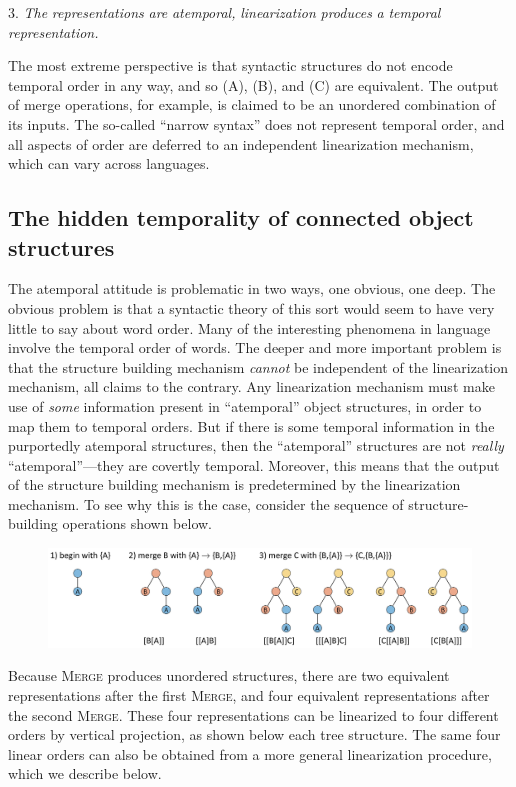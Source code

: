 3. \textit{The} \textit{representations} \textit{are} \textit{atemporal,} \textit{linearization} \textit{produces} \textit{a} \textit{temporal} \textit{representation.}

  The most extreme perspective is that syntactic structures do not encode temporal order in any way, and so (A), (B), and (C) are equivalent. The output of merge operations, for example, is claimed to be an unordered combination of its inputs. The so-called “narrow syntax” does not represent temporal order, and all aspects of order are deferred to an independent linearization mechanism, which can vary across languages. 

\subsection{The hidden temporality of connected object structures}

The atemporal attitude is problematic in two ways, one obvious, one deep. The obvious problem is that a syntactic theory of this sort would seem to have very little to say about word order. Many of the interesting phenomena in language involve the temporal order of words. The deeper and more important problem is that the structure building mechanism \textit{cannot} be independent of the linearization mechanism, all claims to the contrary. Any linearization mechanism must make use of \textit{some} information present in “atemporal” object structures, in order to map them to temporal orders. But if there is some temporal information in the purportedly atemporal structures, then the “atemporal” structures are not \textit{really} “atemporal”—they are covertly temporal. Moreover, this means that the output of the structure building mechanism is predetermined by the linearization mechanism. To see why this is the  case, consider the sequence of structure-building operations shown below.

  
\begin{figure}
\includegraphics[width=\textwidth]{figures/Tilsen-img42.png}
\caption{\missingcaption}
\label{fig:}
\end{figure}
 

  Because \textsc{Merge} produces unordered structures, there are two equivalent representations after the first \textsc{Merge}, and four equivalent representations after the second \textsc{Merge}. These four representations can be linearized to four different orders by vertical projection, as shown below each tree structure. The same four linear orders can also be obtained from a more general linearization procedure, which we describe below.

